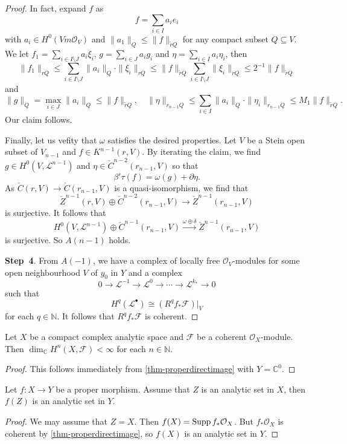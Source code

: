 \begin{proof}
In fact, expand $f$ as 
\[
    f=\sum_{i\in I}a_i e_i  
\]
with $a_i\in H^0(Vm\mathcal{O}_V)$ and $\|a_1\|_Q\leq \|f\|_{\tilde{r}Q}$ for any compact subset $Q\subseteq V$. We let $f_1=\sum_{i\in I\setminus J}a_i \xi_i$, $g=\sum_{i\in J}a_i g_i$ and $\eta=\sum_{i\in I}a_i\eta_i$, then
\[
    \|f_1\|_{rQ}\leq \sum_{i\in I\setminus J}\|a_i\|_Q\cdot\|\xi_i\|_{rQ}\leq \|f\|_{\tilde{r}Q}\sum_{i\in I\setminus J}\|\xi_i\|_{rQ}\leq 2^{-1}\|f\|_{\tilde{r}Q}
\]
and
\[
\|g\|_Q=\max_{i\in J}\|a_i\|_Q\leq \|f\|_{\tilde{r}Q},\quad \|\eta\|_{r_{n-1}Q}\leq \sum_{i\in I}\|a_i\|_Q\cdot\|\eta_i\|_{r_{n-1}Q}\leq M_1\|f\|_{\tilde{r}Q}.    
\]
Our claim follows.

Finally, let us vefity that $\omega$ satisfies the desired properties. Let $V$ be a Stein open subset of $V_{n-1}$ and $f\in K^{n-1}(r,V)$. By iterating the claim, we find $g\in H^0(V,\mathcal{L}^{n-1})$ and $\eta\in \check{C}^{n-2}(r_{n-1},V)$ so that
\[
    \beta'\tau(f)=\omega(g)+\partial \eta.  
\]
As $\check{C}(r,V)\rightarrow \check{C}(r_{n-1},V)$ is a quasi-isomorphism, we find that 
\[
\check{Z}^{n-1}(r,V)\oplus \check{C}^{n-2}(r_{n-1},V)\rightarrow     \check{Z}^{n-1}(r_{n-1},V)
\]
is surjective. It follows that 
\[
H^0(V,\mathcal{L}^{n-1})\oplus \check{C}^{n-1}(r_{n-1},V)\xrightarrow{\omega\oplus \delta} \check{Z}^{n-1}(r_{n-1},V)
\]
is surjective. So $A(n-1)$ holds.

\textbf{Step~4}. From $A(-1)$, we have a complex of locally free $\mathcal{O}_V$-modules for some open neighbourhood $V$ of $y_0$ in $Y$ and a complex
\[
0\rightarrow \mathcal{L}^{-1}\rightarrow \mathcal{L}^0\rightarrow \cdots\rightarrow \mathcal{L}^{k_*}\rightarrow 0    
\]
such that
\[
    H^q(\mathcal{L}^{\bullet})\cong (R^qf_*\mathcal{F})|_V    
\]
for each $q\in \mathbb{N}$. It follows that $R^qf_*\mathcal{F}$ is coherent.
\end{proof}

\begin{corollary}
    Let $X$ be a compact complex analytic space and $\mathcal{F}$ be a coherent $\mathcal{O}_X$-module. Then $\dim_{\mathbb{C}}H^n(X,\mathcal{F})<\infty$ for each $n\in \mathbb{N}$.
\end{corollary}
\begin{proof}
    This follows immediately from \cref{thm-properdirectimage} with $Y=\mathbb{C}^0$.
\end{proof}

\begin{corollary}\label{cor-analyticsetpropimage}
    Let $f:X\rightarrow Y$ be a proper morphism. Assume that $Z$ is an analytic set in $X$, then $f(Z)$ is an analytic set in $Y$. 
\end{corollary}
\begin{proof}
    We may assume that $Z=X$. Then $f(X)=\operatorname{Supp} f_*\mathcal{O}_X$. But $f_*\mathcal{O}_X$ is coherent by \cref{thm-properdirectimage}, so $f(X)$ is an analytic set in $Y$.
\end{proof}


